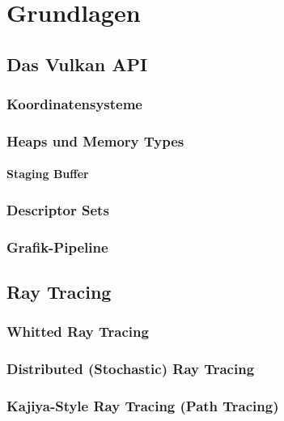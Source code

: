 

\chapter{Grundlagen}

\section{Das Vulkan API}


\subsection{Koordinatensysteme} \label{subsec:coordsystems}


\subsection{Heaps und Memory Types}


\subsubsection{Staging Buffer}

\subsection{Descriptor Sets}


\subsection{Grafik-Pipeline}



\section{Ray Tracing}


\subsection{Whitted Ray Tracing}

\subsection{Distributed (Stochastic) Ray Tracing}


\subsection{Kajiya-Style Ray Tracing (Path Tracing)}


